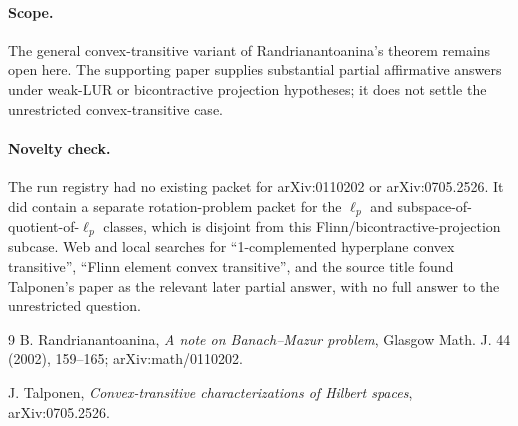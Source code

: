 \documentclass[11pt]{article}
\begin{document}
\paragraph{Scope.}
The general convex-transitive variant of Randrianantoanina's theorem remains
open here.  The supporting paper supplies substantial partial affirmative
answers under weak-LUR or bicontractive projection hypotheses; it does not
settle the unrestricted convex-transitive case.

\paragraph{Novelty check.}
The run registry had no existing packet for arXiv:0110202 or arXiv:0705.2526.
It did contain a separate rotation-problem packet for the \(\ell_p\) and
subspace-of-quotient-of-\(\ell_p\) classes, which is disjoint from this
Flinn/bicontractive-projection subcase.  Web and local searches for
``1-complemented hyperplane convex transitive'', ``Flinn element convex
transitive'', and the source title found Talponen's paper as the relevant
later partial answer, with no full answer to the unrestricted question.

\begin{thebibliography}{9}
B. Randrianantoanina,
\emph{A note on Banach--Mazur problem},
Glasgow Math. J. 44 (2002), 159--165; arXiv:math/0110202.

J. Talponen,
\emph{Convex-transitive characterizations of Hilbert spaces},
arXiv:0705.2526.
\end{thebibliography}
\end{document}
